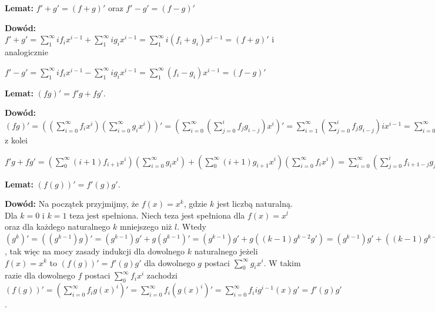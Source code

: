 \documentclass{article}
\begin{document}
\begin{tcolorbox}
    \textbf{Lemat:} $f'+g'=(f+g)'$ oraz $f'-g'=(f-g)'$
    
    \textbf{Dowód:} $f'+g'=\sum_{1}^{\infty}if_ix^{i-1}+\sum_{1}^{\infty}ig_ix^{i-1}=
    \sum_{1}^{\infty}i(f_i+g_i)x^{i-1}=(f+g)'$ i analogicznie
    
    $f'-g'=\sum_{1}^{\infty}if_ix^{i-1}-\sum_{1}^{\infty}ig_ix^{i-1}=
    \sum_{1}^{\infty}(f_i-g_i)x^{i-1}=(f-g)'$ 
\end{tcolorbox}

\begin{tcolorbox}
    \textbf{Lemat:} $(fg)'=f'g+fg'$.
    
    \textbf{Dowód:} $(fg)'=((\sum_{i=0}^{\infty}f_ix^i)(\sum_{i=0}^{\infty}g_ix^i))'=
    (\sum_{i=0}^{\infty}(\sum_{j=0}^if_jg_{i-j})x^i)'=
    \sum_{i=1}^{\infty}(\sum_{j=0}^if_jg_{i-j})ix^{i-1}=
    \sum_{i=0}^{\infty}(\sum_{j=0}^if_jg_{i+1-j})(i+1)x^{i}$ z kolei

    $f'g+fg'=(\sum_{0}^{\infty}(i+1)f_{i+1}x^{i})(\sum_{i=0}^{\infty}g_ix^i)+(\sum_{0}^{\infty}(i+1)g_{i+1}x^{i})(\sum_{i=0}^{\infty}f_ix^i)=
    \sum_{i=0}^\infty(\sum_{j=0}^{i}f_{i+1-j}g_{j}(i+1-j))x^i+
    \sum_{i=0}^\infty(\sum_{j=0}^{i}g_{i+1-j}f_{j}(i+1-j))x^i=
    \sum_{i=0}^\infty(\sum_{j=0}^{i}g_{i+1-j}f_{j}(i+1-j+j))x^i=
    \sum_{i=0}^\infty(\sum_{j=0}^{i}g_{i+1-j}f_{j})(i+1)x^i=(fg)'
    $
\end{tcolorbox}

\begin{tcolorbox}
    \textbf{Lemat:} $(f(g))'=f'(g)g'$.
    
    \textbf{Dowód:} Na początek przyjmijmy, że $f(x)=x^k$, gdzie $k$ jest liczbą naturalną. Dla $k=0$ i $k=1$ teza jest 
    spełniona. Niech teza jest spełniona dla $f(x)=x^l$ oraz dla każdego naturalnego $k$ mniejszego niż $l$.
    Wtedy
    $(g^k)'=((g^{k-1})g)'=(g^{k-1})g'+g(g^{k-1})'=(g^{k-1})g'+g((k-1)g^{k-2}g')=
    (g^{k-1})g'+((k-1)g^{k-1}g')=kg^{k-1}g'$, tak więc na mocy zasady indukcji dla dowolnego $k$ naturalnego jeżeli $f(x)=x^k$ to $(f(g))'=f'(g)g'$ dla dowolnego $g$ postaci $\sum_{0}^{\infty}g_ix^i$. W takim razie dla dowolnego $f$
    postaci $\sum_{0}^{\infty}f_ix^i$ zachodzi  $(f(g))'=(\sum_{i=0}^{\infty}f_ig(x)^i)'=\sum_{i=0}^{\infty}f_i(g(x)^i)'=
    \sum_{i=0}^{\infty}f_i ig^{i-1}(x)g'=f'(g)g'$.

    
    
    
    
    
    
    
    
\end{tcolorbox}
\end{document}
